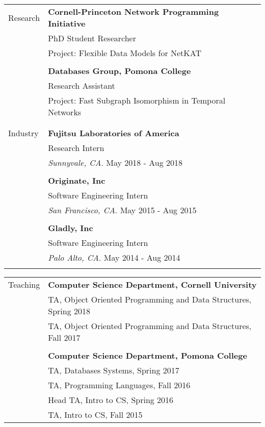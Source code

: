 \documentclass[letterpaper,11pt,oneside]{article}
\begin{document}
\begin{tabular}{@{} l l }
 \Large{Research}
     & \textbf{Cornell-Princeton Network Programming Initiative}\\
     & PhD Student Researcher\\
     & Project: Flexible Data Models for Net\textsc{KAT}\\ \\
     & \textbf{Databases Group, Pomona College} \\ 
     & Research Assistant \\
     & Project: Fast Subgraph Isomorphism in Temporal Networks  \\
     & \\ \\
 \Large{Industry}
     & \textbf{Fujitsu Laboratories of America} \\
     & Research Intern \\
     & \textit{Sunnyvale, CA}. May 2018 - Aug 2018 \\
     & \\
     & \textbf{Originate, Inc} \\
     & Software Engineering Intern \\
     & \textit{San Francisco, CA}. May 2015 - Aug 2015 \\
     & \\
     & \textbf{Gladly, Inc} \\
     & Software Engineering Intern \\
     & \textit{Palo Alto, CA}. May 2014 - Aug 2014 \\ \\
\end{tabular}

\begin{tabular}{@{} l l}
  \Large{Teaching}
  & \textbf{Computer Science Department, Cornell University} \\

  & TA, Object Oriented Programming and Data Structures, Spring 2018 \\
  
  & TA, Object Oriented Programming and Data Structures, Fall 2017 \\
  &\\
  
  & \textbf{Computer Science Department, Pomona College} \\ 
  
  & TA, Databases Systems, Spring 2017 \\

  & TA, Programming Languages, Fall 2016 \\
  
  & Head TA, Intro to CS, Spring 2016 \\
  
  & TA, Intro to CS, Fall 2015 \\


\end{tabular}
\end{document}
